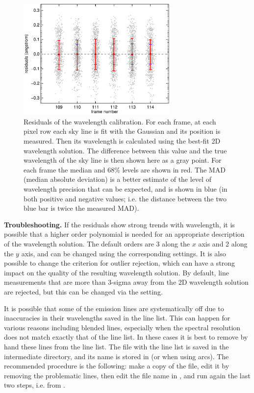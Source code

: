 \documentclass[a4paper]{article}
\begin{document}
\begin{sloppypar}
\begin{figure}[tbp]
\centering
\includegraphics[width=0.7\textwidth]{residuals}
\caption{Residuals of the wavelength calibration. For each frame, at each pixel row each sky line is fit with the Gaussian and its position is measured. Then its wavelength is calculated using the best-fit 2D wavelength solution. The difference between this value and the true wavelength of the sky line is then shown here as a gray point. For each frame the median and 68\% levels are shown in red. The MAD (median absolute deviation) is a better estimate of the level of wavelength precision that can be expected, and is shown in blue (in both positive and negative values; i.e. the distance between the two blue bar is twice the measured MAD).}
\label{fig:residuals}
\end{figure}


\medskip
\noindent
\textbf{Troubleshooting.} If the residuals show strong trends with wavelength, it is possible that a higher order polynomial is needed for an appropriate description of the wavelength solution. The default orders are 3 along the $x$ axis and 2 along the $y$ axis, and can be changed using the corresponding settings. It is also possible to change the criterion for outlier rejection, which can have a strong impact on the quality of the resulting wavelength solution. By default, line measurements that are more than 3-sigma away from the 2D wavelength solution are rejected, but this can be changed via the  setting.

It is possible that some of the emission lines are systematically off due to inaccuracies in their wavelengths saved in the line list. This can happen for various reasons including blended lines, especially when the spectral resolution does not match exactly that of the line list. In these cases it is best to remove by hand these lines from the line list. The file with the line list is saved in the intermediate directory, and its name is stored in  (or  when using arcs). The recommended procedure is the following: make a copy of the file, edit it by removing the problematic lines, then edit the file name in , and run again the last two steps, i.e. from .


\end{sloppypar}
\end{document}
